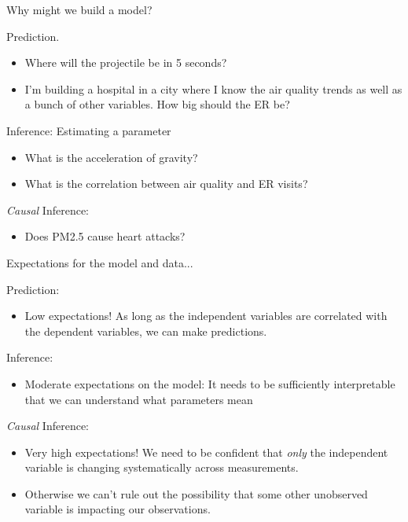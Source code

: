 \documentclass[aspectratio=169]{beamer}
\begin{document}
\begin{frame}{Why might we build a model?}

\pause

Prediction.
\begin{itemize}
\item Where will the projectile be in 5 seconds?
\item I'm building a hospital in a city where I know the air quality trends as well as a bunch of other variables.  How big should the ER be?
\end{itemize}

\hspace{5mm}

Inference: Estimating a parameter
\begin{itemize}
\item What is the acceleration of gravity?
\item What is the correlation between air quality and ER visits?
\end{itemize}

\hspace{5mm}

\textit{Causal }Inference:
\begin{itemize}
\item Does PM2.5 cause heart attacks? 
\end{itemize} 

\end{frame}

\begin{frame}{Expectations for the model and data...}

Prediction:
\begin{itemize}
\item Low expectations! As long as the independent variables are correlated with the dependent variables, we can make predictions.
\end{itemize}
\hspace{2mm}

Inference: 
\begin{itemize}
\item Moderate expectations on the model: It needs to be sufficiently interpretable that we can understand what parameters mean
\end{itemize}
\hspace{2mm}

\textit{Causal }Inference:
\begin{itemize}
\item Very high expectations!  We need to be confident that \textit{only} the independent variable is changing systematically across measurements.  
\item Otherwise we can't rule out the possibility that some other unobserved variable is impacting our observations.
\end{itemize}

\end{frame}
\end{document}
